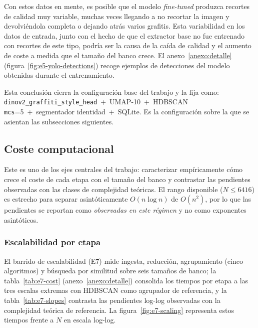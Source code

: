 Con estos datos en mente, es posible que el modelo \textit{fine-tuned} produzca
recortes de calidad muy variable, muchas veces llegando a no recortar la imagen
y devolviéndola completa o dejando atrás varios grafitis. Esta variabilidad en
los datos de entrada, junto con el hecho de que el extractor base no fue
entrenado con recortes de este tipo, podría ser la causa de la caída de calidad
y el aumento de coste a medida que el tamaño del banco crece. El
anexo~\ref{anexo:detalle} (figura~\ref{fig:e5-yolo-detections}) recoge ejemplos
de detecciones del modelo obtenidas durante el entrenamiento.

Esta conclusión cierra la configuración base del trabajo y la fija como:
\texttt{dinov2\_graffiti\_style\_head}~+~UMAP-10~+~HDBSCAN
\texttt{mcs}=5~+~segmentador identidad~+~SQLite. Es la configuración sobre la
que se asientan las subsecciones siguientes.

\subsection{Coste computacional}
\label{subsec:res-coste}
Este es uno de los ejes centrales del trabajo: caracterizar empíricamente cómo
crece el coste de cada etapa con el tamaño del banco y contrastar las
pendientes observadas con las clases de complejidad teóricas. El rango
disponible ($N\le 6416$) es estrecho para separar asintóticamente $O(n\log n)$
de $O(n^2)$, por lo que las pendientes se reportan como \emph{observadas en
este régimen} y no como exponentes asintóticos.

\subsubsection{Escalabilidad por etapa}
\label{subsubsec:res-escalabilidad}
El barrido de escalabilidad (E7) mide ingesta, reducción, agrupamiento (cinco
algoritmos) y búsqueda por similitud sobre seis tamaños de banco; la
tabla~\ref{tab:e7-cost} (anexo~\ref{anexo:detalle}) consolida los tiempos por
etapa a las tres escalas extremas con HDBSCAN como agrupador de referencia, y la
tabla~\ref{tab:e7-slopes} contrasta las pendientes log-log observadas con la
complejidad teórica de referencia. La figura~\ref{fig:e7-scaling} representa
estos tiempos frente a $N$ en escala log-log.


